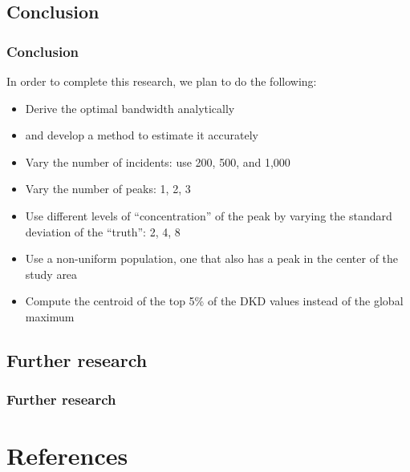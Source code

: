 \documentclass[notheorems]{beamer}
\theoremstyle{definition}
\theoremstyle{example}
\begin{document}
\subsection{Conclusion}
\begin{frame}\frametitle{Conclusion}
    In order to complete this research, we plan to do the following:
    \begin{itemize}
        \item Derive the \alert{optimal bandwidth} analytically
        \item \textellipsis and develop a method to estimate it accurately
        \item Vary the number of incidents: use 200, 500, and 1,000
        \item Vary the number of peaks: 1, 2, 3
        \item Use different levels of ``concentration'' of the peak by varying the standard deviation of the ``truth'': 2, 4, 8
        \item Use a non-uniform population, one that also has a peak in the center of the study area
        \item Compute the centroid of the top 5\% of the DKD values instead of the global maximum
    \end{itemize}
\end{frame}

\subsection{Further research}
\begin{frame}\frametitle{Further research}
\end{frame}

\section*{References}
\end{document}

